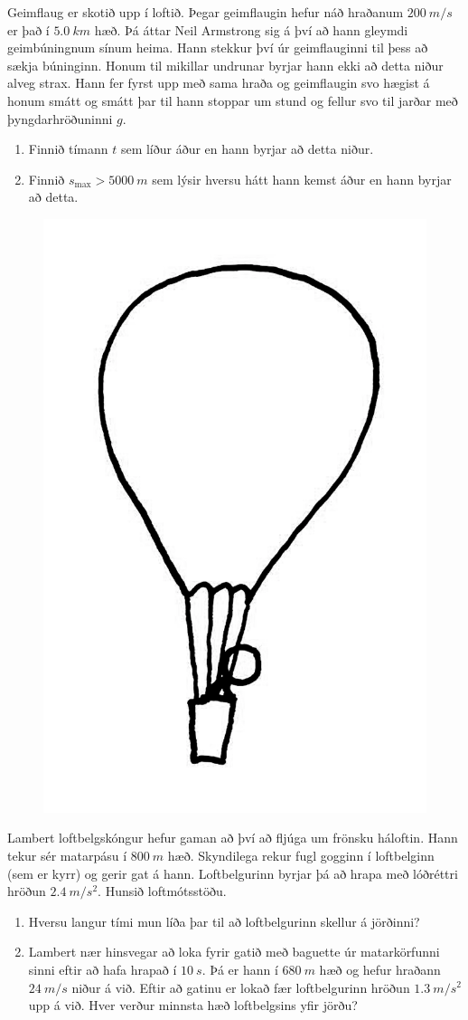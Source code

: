\begin{enumerate}[label = \textbf{Dæmi \thechapter.\arabic*.}]
\item Geimflaug er skotið upp í loftið. Þegar geimflaugin hefur náð hraðanum $\SI{200}{m/s}$ er það í $\SI{5.0}{km}$ hæð. Þá áttar Neil Armstrong sig á því að hann gleymdi geimbúningnum sínum heima. Hann stekkur því úr geimflauginni til þess að sækja búninginn. Honum til mikillar undrunar byrjar hann ekki að detta niður alveg strax. Hann fer fyrst upp með sama hraða og geimflaugin svo hægist á honum smátt og smátt þar til hann stoppar um stund og fellur svo til jarðar með þyngdarhröðuninni $g$.
\begin{enumerate}[label = \textbf{(\alph*)}]
\item Finnið tímann $t$ sem líður áður en hann byrjar að detta niður.
\item Finnið $s_{\text{max}} > \SI{5000}{m}$ sem lýsir hversu hátt hann kemst áður en hann byrjar að detta.
\end{enumerate}

\begin{minipage}{\linewidth}

\begin{figure}

\includegraphics[width=1 in]{images/loftbelgur.png}

\end{figure}

\item
Lambert loftbelgskóngur hefur gaman að því að fljúga um frönsku háloftin. Hann tekur sér matarpásu í $\SI{800}{m}$ hæð. Skyndilega rekur fugl gogginn í loftbelginn (sem er kyrr) og gerir gat á hann. Loftbelgurinn byrjar þá að hrapa með lóðréttri hröðun $\SI{2.4}{m/s^2}$. Hunsið loftmótsstöðu.
\begin{enumerate}[label = \textbf{(\alph*)}]
\item Hversu langur tími mun líða þar til að loftbelgurinn skellur á jörðinni?
\item
Lambert nær hinsvegar að loka fyrir gatið með baguette úr matarkörfunni sinni eftir að hafa hrapað í $\SI{10}{s}$. Þá er hann í $\SI{680}{m}$ hæð og hefur hraðann $\SI{24}{m/s}$ niður á við. Eftir að gatinu er lokað fær loftbelgurinn hröðun $\SI{1.3}{m/s^2}$ upp á við. Hver verður minnsta hæð loftbelgsins yfir jörðu?
\end{enumerate}
\end{minipage}




\end{enumerate}
